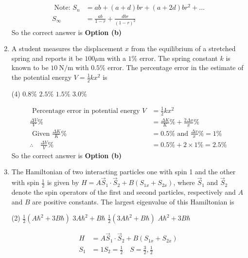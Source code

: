 \begin{enumerate}
\begin{answer}
\begin{align*}
\text { Note: } S_{n}&=a b+(a+d) b r+(a+2 d) b r^{2}+\ldots\\
S_{\infty}&=\frac{a b}{1-r}+\frac{d b r}{(1-r)^{2}}
	\end{align*}
		So the correct answer is \textbf{Option (b)}
\end{answer}
\item A student measures the displacement $x$ from the equilibrium of a stretched spring and reports it be $100 \mu \mathrm{m}$ with a $1 \%$ error. The spring constant $k$ is known to be $10 \mathrm{~N} / \mathrm{m}$ with $0.5 \%$ error. The percentage error in the estimate of the potential energy $V=\frac{1}{2} k x^{2}$ is
 \begin{tasks}(4)
	\task[\textbf{a.}]$0.8 \%$
	\task[\textbf{b.}] $2.5 \%$
	\task[\textbf{c.}] $1.5 \%$
	\task[\textbf{d.}] $3.0 \%$ 
\end{tasks}
\begin{answer}
	\begin{align*}
	\text { Percentage error in potential energy } V&=\frac{1}{2} k x^{2}\\
	\frac{\Delta V}{V} \%&=\frac{\Delta K}{K} \%+\frac{2 \Delta x}{x} \%\\
\text{	Given }\frac{\Delta K}{K} \%&=0.5 \%\text{ and }\frac{\Delta x}{x} \%=1 \%\\
	\therefore \quad \frac{\Delta V}{V} \%&=0.5 \%+2 \times 1 \%=2.5 \%
	\end{align*}
		So the correct answer is \textbf{Option (b)}
\end{answer}
\item The Hamiltonian of two interacting particles one with spin 1 and the other with spin $\frac{1}{2}$ is given by $H=A \vec{S}_{1} \cdot \vec{S}_{2}+B\left(S_{1 x}+S_{2 x}\right)$, where $\vec{S}_{1}$ and $\vec{S}_{2}$ denote the spin operators of the first and second particles, respectively and $A$ and $B$ are positive constants. The largest eigenvalue of this Hamiltonian is
 \begin{tasks}(2)
	\task[\textbf{a.}] $\frac{1}{2}\left(A \hbar^{2}+3 B \hbar\right)$
	\task[\textbf{b.}]$3 A \hbar^{2}+B \hbar$
	\task[\textbf{c.}] $\frac{1}{2}\left(3 A \hbar^{2}+B \hbar\right)$
	\task[\textbf{d.}]  $A \hbar^{2}+3 B \hbar$	
\end{tasks}
\begin{answer}
	\begin{align*}
	H&=A \vec{S}_{1} \cdot \vec{S}_{2}+B\left(S_{1 x}+S_{2 x}\right)\\
	S_{1}&=1 S_{2}=\frac{1}{2} \quad S=\frac{3}{2}, \frac{1}{2} \\

\end{align*}
\end{answer}
\end{enumerate}

